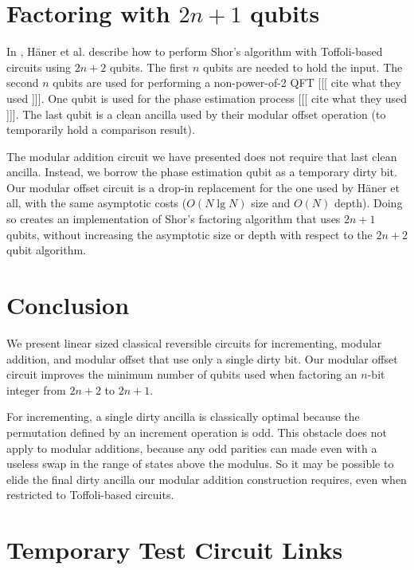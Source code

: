 \documentclass[twocolumn]{article}
\begin{document}
\section{Factoring with $2n+1$ qubits} \label{sec:applications}

In \cite{haner2016}, H\"{a}ner et al. describe how to perform Shor's algorithm with Toffoli-based circuits using $2n+2$ qubits.
The first $n$ qubits are needed to hold the input.
The second $n$ qubits are used for performing a non-power-of-2 QFT [[[ cite what they used ]]].
One qubit is used for the phase estimation process [[[ cite what they used ]]].
The last qubit is a clean ancilla used by their modular offset operation (to temporarily hold a comparison result).

The modular addition circuit we have presented does not require that last clean ancilla.
Instead, we borrow the phase estimation qubit as a temporary dirty bit.
Our modular offset circuit is a drop-in replacement for the one used by H\"{a}ner et all, with the same asymptotic costs ($O(N \lg N)$ size and $O(N)$ depth).
Doing so creates an implementation of Shor's factoring algorithm that uses $2n+1$ qubits, without increasing the asymptotic size or depth with respect to the $2n+2$ qubit algorithm.

\section{Conclusion} \label{sec:conclusion}

We present linear sized classical reversible circuits for incrementing, modular addition, and modular offset that use only a single dirty bit.
Our modular offset circuit improves the minimum number of qubits used when factoring an $n$-bit integer from $2n+2$ to $2n+1$.

For incrementing, a single dirty ancilla is classically optimal because the permutation defined by an increment operation is odd.
This obstacle does not apply to modular additions, because any odd parities can made even with a useless swap in the range of states above the modulus.
So it may be possible to elide the final dirty ancilla our modular addition construction requires, even when restricted to Toffoli-based circuits.




\section{Temporary Test Circuit Links}
\end{document}
